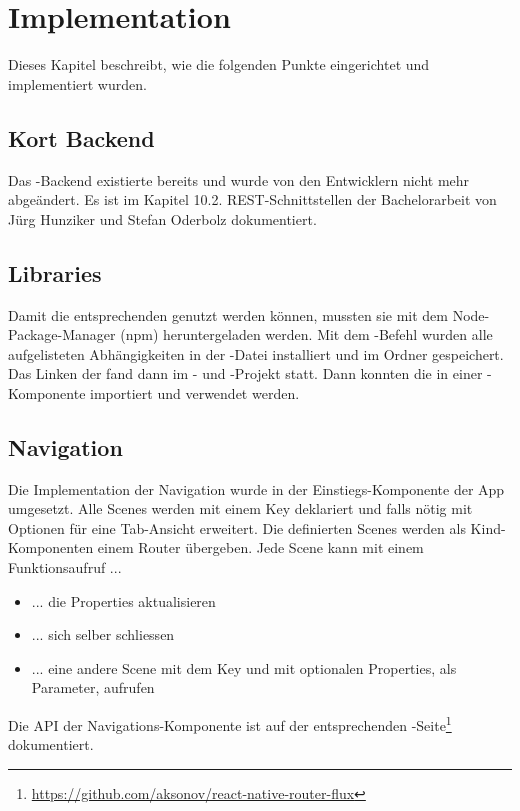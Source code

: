 \chapter{Implementation}
\label{pd-implementation}
Dieses Kapitel beschreibt, wie die folgenden Punkte eingerichtet und implementiert wurden. 


\section{Kort Backend}
Das \kort{}-Backend existierte bereits und wurde von den Entwicklern nicht mehr abgeändert. 
Es ist im Kapitel 10.2. \gls{REST}-Schnittstellen der Bachelorarbeit von Jürg Hunziker und Stefan Oderbolz dokumentiert.\cite{ba-kort-2012}


\section{Libraries}
Damit die entsprechenden  genutzt werden können, mussten sie mit dem Node-Package-Manager (npm) heruntergeladen werden. 
Mit dem -Befehl wurden alle aufgelisteten Abhängigkeiten in der  -Datei installiert und im Ordner  gespeichert.
Das Linken der  fand dann im - und -Projekt statt. 
Dann konnten die  in einer -Komponente importiert und verwendet werden. 


\section{Navigation}
Die Implementation der Navigation wurde in der Einstiegs-Komponente der App umgesetzt. 
Alle Scenes werden mit einem Key deklariert und falls nötig mit Optionen für eine Tab-Ansicht erweitert. 
Die definierten Scenes werden als Kind-Komponenten einem Router übergeben. 
Jede Scene kann mit einem Funktionsaufruf ...
\begin{itemize}
	\item ... die Properties aktualisieren
	\item ... sich selber schliessen
	\item ... eine andere Scene mit dem Key und mit optionalen Properties, als Parameter, aufrufen
\end{itemize} 
Die \gls{API} der Navigations-Komponente ist auf der entsprechenden -Seite\footnote{\url{https://github.com/aksonov/react-native-router-flux}} dokumentiert. 


